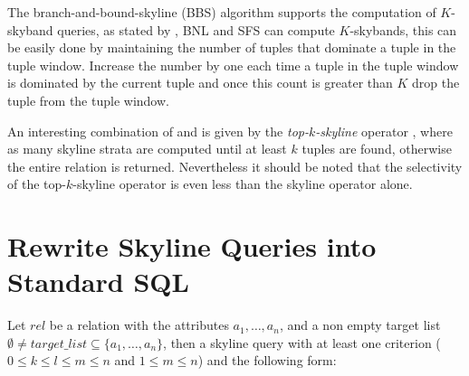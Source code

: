 The branch-and-bound-skyline (BBS) algorithm \citep{Papadias2005} supports the
computation of $K$-skyband queries, as stated by \citet{Papadias2005},
BNL and SFS can compute $K$-skybands, this can be easily done by
maintaining the number of tuples that dominate a tuple in the tuple
window. Increase the number by one each time a tuple in the tuple
window is dominated by the current tuple and once this count is
greater than $K$ drop the tuple from the tuple window.


An interesting combination of  and
 is given by the
\emph{top-$k$-skyline} operator
\citep{Brando2007, Goncalves2005a, Goncalves2005}, where as many 
skyline strata are computed until at least $k$ tuples are found, otherwise
the entire relation is returned.  Nevertheless it should be noted that
the selectivity of the top-$k$-skyline operator is even less
than the skyline operator alone.


\section{Rewrite Skyline Queries into Standard SQL}
\label{sec:rewrite-to-sql}

Let $rel$ be a relation with the attributes $a_1, \ldots, a_n$, and a non
empty target list $\emptyset \not= target\_list \subseteq \{a_1,
\ldots, a_n\}$, then a skyline query with at least one criterion ($0
\le k \le l \le m \le n$ and $1 \le m \le n$) and the following form:

